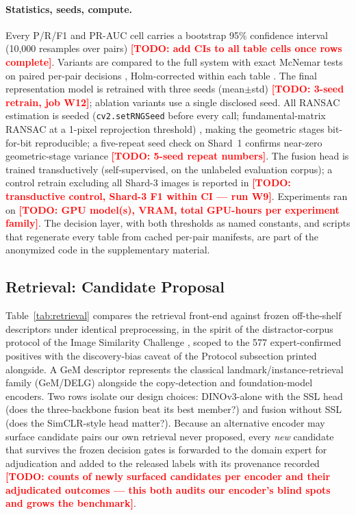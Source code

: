\documentclass[letterpaper]{article} %
\newcommand{\todo}[1]{\textcolor{red}{\textbf{[TODO: #1]}}}
\begin{document}
\paragraph{Statistics, seeds, compute.}
Every P/R/F1 and PR-AUC cell carries a bootstrap 95\% confidence interval
(10{,}000 resamples over pairs) \cite{efron1993bootstrap}
\todo{add CIs to all table cells once rows complete}. Variants are
compared to the full system with exact McNemar tests on paired per-pair
decisions \cite{mcnemar1947}, Holm-corrected within each table
\cite{holm1979}. The final representation model is retrained with three
seeds (mean$\pm$std) \todo{3-seed retrain, job W12}; ablation variants use
a single disclosed seed. All RANSAC estimation is seeded
(\texttt{cv2.setRNGSeed} before every call; fundamental-matrix RANSAC at a
1-pixel reprojection threshold) \cite{fischler1981ransac}, making the
geometric stages bit-for-bit reproducible; a five-repeat seed check on
Shard~1 confirms near-zero geometric-stage variance \todo{5-seed repeat
numbers}. The fusion head is trained transductively (self-supervised, on
the unlabeled evaluation corpus); a control retrain excluding all Shard-3
images is reported in \todo{transductive control, Shard-3 F1 within CI ---
run W9}. Experiments ran on \todo{GPU model(s), VRAM, total GPU-hours per
experiment family}. The decision layer, with both thresholds as named
constants, and scripts that regenerate every table from cached per-pair
manifests, are part of the anonymized code in the supplementary material.

\subsection{Retrieval: Candidate Proposal}

Table~\ref{tab:retrieval} compares the retrieval front-end against frozen
off-the-shelf descriptors under identical preprocessing, in the spirit of
the distractor-corpus protocol of the Image Similarity Challenge
\cite{douze2021disc}, scoped to the 577 expert-confirmed positives with the
discovery-bias caveat of the Protocol subsection printed alongside. A GeM
descriptor \cite{radenovic2019gem} represents the classical
landmark/instance-retrieval family (GeM/DELG) alongside the copy-detection
and foundation-model encoders. Two rows isolate our design choices:
DINOv3-alone with the SSL head (does the three-backbone fusion beat its
best member?) and fusion without SSL (does the SimCLR-style head
\cite{chen2020simclr} matter?). Because an alternative encoder may surface
candidate pairs our own retrieval never proposed, every \emph{new}
candidate that survives the frozen decision gates is forwarded to the
domain expert for adjudication and added to the released labels with its
provenance recorded \todo{counts of newly surfaced candidates per encoder
and their adjudicated outcomes --- this both audits our encoder's blind
spots and grows the benchmark}.
\end{document}
